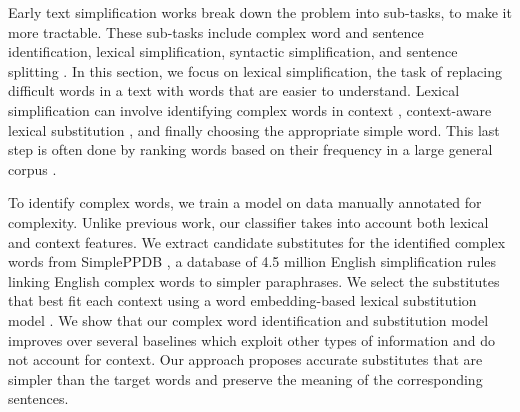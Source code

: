 Early text simplification works break down the problem into sub-tasks, to make it more tractable. These sub-tasks include complex word and sentence identification, lexical simplification, syntactic simplification, and sentence splitting \citep{saggion2017automatic}. In this section, we focus on lexical simplification, the task of replacing difficult words in a text with words that are easier to understand. Lexical simplification can involve identifying complex words in context \citep{shardlow2013cw}, context-aware lexical substitution \citep{biran2011putting}, and finally choosing the appropriate simple word. This last step is often done by ranking words based on their frequency in a large general corpus \citep{devlin1998use}.

To identify complex words, we train a model on data manually annotated for complexity. Unlike previous work, our classifier takes into account both lexical and context features. We extract candidate substitutes for the identified complex words from SimplePPDB \citep{pavlick2016simple}, a database of 4.5 million English simplification rules linking English complex words to simpler paraphrases. We select the substitutes that best fit each context using a word embedding-based lexical substitution model \citep{melamud2015simple}. We show that our complex word identification and substitution model improves over several baselines which exploit other types of information and do not account for context. Our approach proposes accurate substitutes that are simpler than the target words and preserve the meaning of the corresponding sentences.



